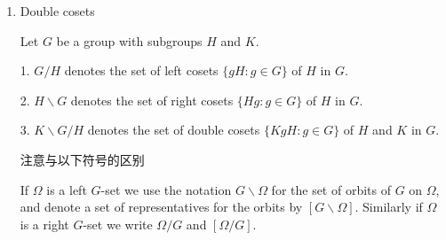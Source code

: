 \documentclass{ctexart}
\begin{document}
\begin{enumerate}
\item Double cosets

Let $G$ be a group with subgroups $H$ and $K$.

1. $G/H$ denotes the set of left cosets $\{gH : g \in G\}$ of $H$ in $G$.

2. $H\backslash G$ denotes the set of right cosets $\{Hg : g \in G\}$ of $H$ in $G$.

3. $K\backslash G/H$ denotes the set of double cosets $\{KgH : g \in G\}$ of $H$ and $K$ in $G$.

注意与以下符号的区别

If $\Omega$ is a left $G$-set we use the notation $G\backslash \Omega$ for the set of orbits of $G$ on $\Omega$, and denote a set of representatives for the orbits by $[G\backslash \Omega]$. Similarly if $\Omega$ is a right $G$-set we write $\Omega /G$ and $[\Omega/G]$.
\end{enumerate}
\printbibliography
\end{document}

